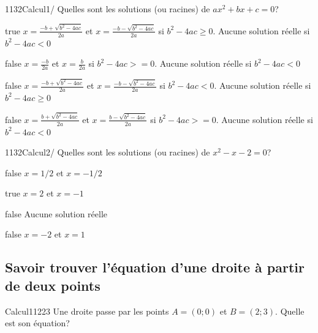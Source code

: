 \documentclass[11pt]{article}
\begin{document}
        	\begin{question}{1132}{Calcul}{1}{/}
				Quelles sont les solutions (ou racines) de $ax^2+bx+c=0$?
            \end{question}

            \begin{reponses}
            	\item[true] $x=\frac{-b+\sqrt{b^2-4ac}}{2a}$ et $x=\frac{-b-\sqrt{b^2-4ac}}{2a}$ si $b^2-4ac\geq 0$. Aucune solution réelle si $b^2-4ac<0$
            	\item[false] $x=\frac{-b}{2a}$ et $x=\frac{b}{2a}$ si $b^2-4ac>=0$. Aucune solution réelle si $b^2-4ac<0$
                \item[false] $x=\frac{-b+\sqrt{b^2-4ac}}{2a}$ et $x=\frac{-b-\sqrt{b^2-4ac}}{2a}$ si $b^2-4ac<0$. Aucune solution réelle si $b^2-4ac\geq 0$
                \item[false] $x=\frac{b+\sqrt{b^2-4ac}}{2a}$ et $x=\frac{b-\sqrt{b^2-4ac}}{2a}$ si $b^2-4ac>=0$. Aucune solution réelle si $b^2-4ac<0$
            \end{reponses}
        
        	\begin{question}{1132}{Calcul}{2}{/}
				Quelles sont les solutions (ou racines) de $x^2-x-2=0$?
            \end{question}

            \begin{reponses}
            	\item[false] $x=1/2$ et $x=-1/2$
            	\item[true] $x=2$ et $x=-1$
                \item[false] Aucune solution réelle
                \item[false] $x=-2$ et $x=1$
            \end{reponses}
        

        \subsection{Savoir trouver l'équation d'une droite à partir de deux points}
        
        	\begin{question}{27}{Calcul}{1}{1223}
				Une droite passe par les points $A = (0;0)$ et $B = (2;3)$. Quelle est son équation?
            \end{question}
\end{document}
